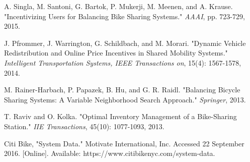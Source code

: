 \documentclass[times, 10pt,twocolumn]{article}
\begin{document}
%
%

\nocite{ex1,ex2}



\begin{thebibliography}{}\setlength{\itemsep}{-1ex}\small

A. Singla, M. Santoni, G. Bartok, P. Mukerji, M. Meenen, and A. Krause. "Incentivizing Users for Balancing Bike Sharing Systems." \textit{AAAI}, pp. 723-729, 2015.

J. Pfrommer, J. Warrington, G. Schildbach, and M. Morari. "Dynamic Vehicle Redistribution and Online Price Incentives in Shared Mobility Systems." \textit{Intelligent Transportation Systems, IEEE Transactions on}, 15(4): 1567-1578, 2014.

M. Rainer-Harbach, P. Papazek, B. Hu, and G. R. Raidl. "Balancing Bicycle Sharing Systems: A Variable Neighborhood Search Approach." \textit{Springer}, 2013.

T. Raviv and O. Kolka. "Optimal Inventory Management of a Bike-Sharing Station." \textit{IIE Transactions}, 45(10): 1077-1093, 2013.

Citi Bike, "System Data." Motivate International, Inc. Accessed 22 September 2016. [Online]. Available: https://www.citibikenyc.com/system-data.

\end{thebibliography}
\end{document}
